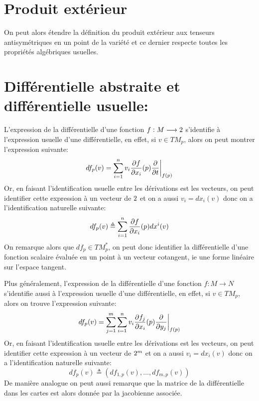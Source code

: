    \section{Produit extérieur}
      On peut alors étendre la définition du produit extérieur aux tenseurs antisymétriques en un point de la variété et ce dernier respecte toutes les propriétés algébriques usuelles.
   \section{Différentielle abstraite et différentielle usuelle:}
      L'expression de la différentielle d'une fonction \( f : M \longrightarrow 2 \) s'identifie à l'expression usuelle d'une différentielle, en effet, si \( v \in TM_p \), alors on peut montrer l'expression suivante:
      \[ 
         df_p(v) = \sum_{i=1}^n v_i \frac{\partial f}{\partial x_i}(p)\frac{\partial }{\partial t}\biggr|_{f(p)}
      \]
      Or, en faisant l'identification usuelle entre les dérivations est les vecteurs, on peut identifier cette expression à un vecteur de \(2\) et on a aussi \( v_i = dx_i(v) \) donc on a l'identification naturelle suivante:
      \[ 
         df_p(v) \triangleq \sum_{i=1}^n \frac{\partial f}{\partial x_i}(p)dx^i(v)
      \]
      On remarque alors que \( df_p \in TM^*_p \), on peut donc identifier la différentielle d'une fonction scalaire évaluée en un point à un vecteur cotangent, ie une forme linéaire sur l'espace tangent.\<

      Plus généralement, l'expression de la différentielle d'une fonction \( f : M \longrightarrow N \) s'identifie aussi à l'expression usuelle d'une différentielle, en effet, si \( v \in TM_p \), alors on trouve l'expression suivante:
      \[ 
         df_p(v) = \sum_{j=1}^m\sum_{i=1}^n v_i \frac{\partial f_j}{\partial x_i}(p)\frac{\partial }{\partial y_j}\biggr|_{f(p)}
      \]
      Or, en faisant l'identification usuelle entre les dérivations est les vecteurs, on peut identifier cette expression à un vecteur de \(2^m\) et on a aussi \( v_i = dx_i(v) \) donc on a l'identification naturelle suivante:
      \[ 
         df_p(v) \triangleq (df_{1, p}(v), \ldots, df_{m, p}(v))
      \]
      De manière analogue on peut aussi remarque que la matrice de la différentielle dans les cartes est alors donnée par la jacobienne associée.
